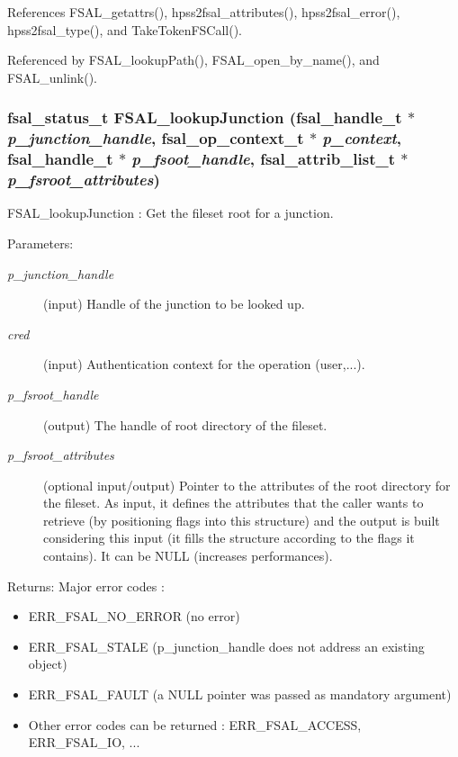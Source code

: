 References FSAL\_\-getattrs(), hpss2fsal\_\-attributes(), hpss2fsal\_\-error(), hpss2fsal\_\-type(), and Take\-Token\-FSCall().

Referenced by FSAL\_\-lookup\-Path(), FSAL\_\-open\_\-by\_\-name(), and FSAL\_\-unlink().
\subsubsection{\setlength{\rightskip}{0pt plus 5cm}fsal\_\-status\_\-t FSAL\_\-lookup\-Junction (fsal\_\-handle\_\-t $\ast$ {\em p\_\-junction\_\-handle}, fsal\_\-op\_\-context\_\-t $\ast$ {\em p\_\-context}, fsal\_\-handle\_\-t $\ast$ {\em p\_\-fsoot\_\-handle}, fsal\_\-attrib\_\-list\_\-t $\ast$ {\em p\_\-fsroot\_\-attributes})}\label{fsal__lookup_8c_a1}


FSAL\_\-lookup\-Junction : Get the fileset root for a junction.

\begin{Desc}
\item[Parameters:]
\begin{description}
\item[{\em p\_\-junction\_\-handle}](input) Handle of the junction to be looked up. \item[{\em cred}](input) Authentication context for the operation (user,...). \item[{\em p\_\-fsroot\_\-handle}](output) The handle of root directory of the fileset. \item[{\em p\_\-fsroot\_\-attributes}](optional input/output) Pointer to the attributes of the root directory for the fileset. As input, it defines the attributes that the caller wants to retrieve (by positioning flags into this structure) and the output is built considering this input (it fills the structure according to the flags it contains). It can be NULL (increases performances).\end{description}
\end{Desc}
\begin{Desc}
\item[Returns:]Major error codes :\begin{itemize}
\item ERR\_\-FSAL\_\-NO\_\-ERROR (no error)\item ERR\_\-FSAL\_\-STALE (p\_\-junction\_\-handle does not address an existing object)\item ERR\_\-FSAL\_\-FAULT (a NULL pointer was passed as mandatory argument)\item Other error codes can be returned : ERR\_\-FSAL\_\-ACCESS, ERR\_\-FSAL\_\-IO, ... \end{itemize}
\end{Desc}



